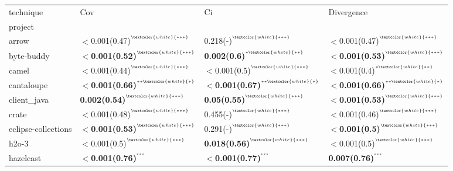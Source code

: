 \begin{tabular}{llll}
\toprule
technique &                                                           Cov &                                                            Ci &                                                    Divergence \\
project             &                                                               &                                                               &                                                               \\
\midrule
arrow               &  $<$0.001(0.47)\tiny{$^{^{\textcolor{white}{***}}}$} &  0.218(-)\tiny{$^{^{\textcolor{white}{***}}}$} &  $<$0.001(0.47)\tiny{$^{^{\textcolor{white}{***}}}$} \\
byte-buddy          &  \textbf{$<$0.001(0.52)}\tiny{$^{^{\textcolor{white}{***}}}$} &  \textbf{0.002(0.6)}\tiny{$^{^{*\textcolor{white}{**}}}$} &  \textbf{$<$0.001(0.53)}\tiny{$^{^{\textcolor{white}{***}}}$} \\
camel               &  $<$0.001(0.44)\tiny{$^{^{\textcolor{white}{***}}}$} &  $<$0.001(0.5)\tiny{$^{^{\textcolor{white}{***}}}$} &  $<$0.001(0.4)\tiny{$^{^{*\textcolor{white}{**}}}$} \\
cantaloupe          &  \textbf{$<$0.001(0.66)}\tiny{$^{^{**\textcolor{white}{*}}}$} &  \textbf{$<$0.001(0.67)}\tiny{$^{^{**\textcolor{white}{*}}}$} &  \textbf{$<$0.001(0.66)}\tiny{$^{^{**\textcolor{white}{*}}}$} \\
client_java         &  \textbf{0.002(0.54)}\tiny{$^{^{\textcolor{white}{***}}}$} &  \textbf{0.05(0.55)}\tiny{$^{^{\textcolor{white}{***}}}$} &  \textbf{$<$0.001(0.53)}\tiny{$^{^{\textcolor{white}{***}}}$} \\
crate               &  $<$0.001(0.48)\tiny{$^{^{\textcolor{white}{***}}}$} &  0.455(-)\tiny{$^{^{\textcolor{white}{***}}}$} &  $<$0.001(0.46)\tiny{$^{^{\textcolor{white}{***}}}$} \\
eclipse-collections &  \textbf{$<$0.001(0.53)}\tiny{$^{^{\textcolor{white}{***}}}$} &  0.291(-)\tiny{$^{^{\textcolor{white}{***}}}$} &  \textbf{$<$0.001(0.5)}\tiny{$^{^{\textcolor{white}{***}}}$} \\
h2o-3               &  $<$0.001(0.5)\tiny{$^{^{\textcolor{white}{***}}}$} &  \textbf{0.018(0.56)}\tiny{$^{^{\textcolor{white}{***}}}$} &  $<$0.001(0.5)\tiny{$^{^{\textcolor{white}{***}}}$} \\
hazelcast           &  \textbf{$<$0.001(0.76)}\tiny{$^{^{***}}$} &  \textbf{$<$0.001(0.77)}\tiny{$^{^{***}}$} &  \textbf{0.007(0.76)}\tiny{$^{^{***}}$} \\

\end{tabular}
